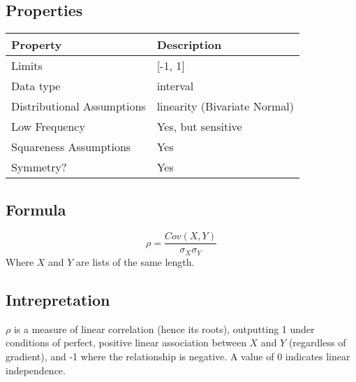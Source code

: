\documentclass[11pt]{article}
\begin{document}
\subsection{Properties}
\begin{tabular}{| l || l |}
    \hline
    {\bf Property} & {\bf Description} \\
    \hline
    Limits & [-1, 1] \\ \hline

    Data type & interval \\ \hline

    Distributional Assumptions & linearity (Bivariate Normal) \\ \hline

    Low Frequency & Yes, but sensitive \\ \hline

    Squareness Assumptions & Yes \\ \hline

    Symmetry? & Yes \\ \hline

\end{tabular}


\subsection{Formula}
$$
\rho = \frac{Cov(X,Y)}{\sigma_X \sigma_Y}
$$
Where $X$ and $Y$ are lists of the same length.

\subsection{Intrepretation}
$\rho$ is a measure of linear correlation (hence its roots), outputting 1 under conditions of perfect, positive linear association between $X$ and $Y$ (regardless of gradient), and -1 where the relationship is negative.  A value of 0 indicates linear independence.  
\end{document}
